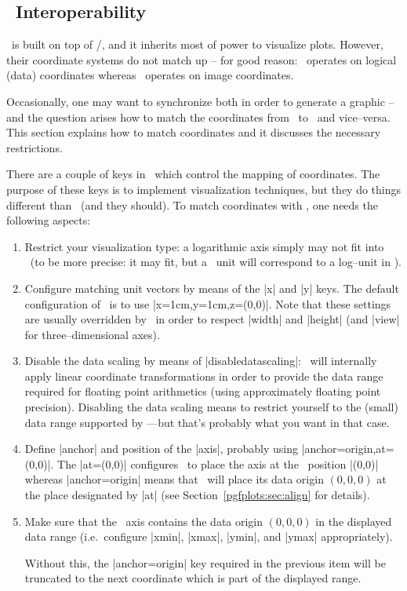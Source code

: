 \subsection{\tikzname\ Interoperability}
\label{pgfplots:tikz:interoperability}

\PGFPlots\ is built on top of \Tikz/\pgfname, and it inherits most of power to visualize plots. However, their coordinate systems do not match up -- for good reason: \PGFPlots\ operates on logical (data) coordinates whereas \Tikz\ operates on image coordinates. 

Occasionally, one may want to synchronize both in order to generate a graphic -- and the question arises how to match the coordinates from \Tikz\ to \PGFPlots\ and vice--versa. This section explains how to match coordinates and it discusses the necessary restrictions.

There are a couple of keys in \PGFPlots\ which control the mapping of coordinates. The purpose of these keys is to implement visualization techniques, but they do things different than \Tikz\ (and they should). To match coordinates with \Tikz, one needs the following aspects:
\begin{enumerate}
	\item Restrict your visualization type: a logarithmic axis simply may not fit into \Tikz\ (to be more precise: it may fit, but a \Tikz\ unit will correspond to a log--unit in \PGFPlots).

	\item Configure matching unit vectors by means of the |x| and |y| keys. The default configuration of \Tikz\ is to use |x=1cm,y=1cm,z={(0,0)}|. Note that these settings are usually overridden by \PGFPlots\ in order to respect |width| and |height| (and |view| for three--dimensional axes).
	\item Disable the data scaling by means of |disabledatascaling|: \PGFPlots\ will internally apply linear coordinate transformations in order to provide the data range required for floating point arithmetics (using approximately floating point precision). Disabling the data scaling means to restrict yourself to the (small) data range supported by \Tikz---but that's probably what you want in that case.
	\item Define |anchor| and position of the |axis|, probably using |anchor=origin,at={(0,0)}|. The |at={(0,0)}| configures \PGFPlots\ to place the axis at the \Tikz\ position |(0,0)| whereas |anchor=origin| means that \PGFPlots\ will place its data origin $(0,0,0)$ at the place designated by |at| (see Section~\ref{pgfplots:sec:align} for details).

	\item Make sure that the \PGFPlots\ axis contains the data origin $(0,0,0)$ in the displayed data range (i.e.\ configure |xmin|, |xmax|, |ymin|, and |ymax| appropriately).

	Without this, the |anchor=origin| key required in the previous item will be truncated to the next coordinate which is part of the displayed range.
\end{enumerate}

